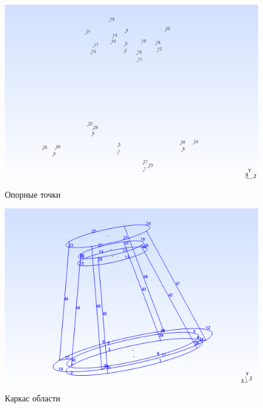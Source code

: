 \documentclass[a4paper, 14pt]{extreport}
\begin{document}
\begin{figure}[H]
	\center
	\includegraphics[scale=0.4]{pictures/main_points.png}
	\caption{Опорные точки}
	\label{fig: main_points}
\end{figure}

\begin{figure}[H]
	\center
	\includegraphics[scale=0.35]{pictures/skeleton.png}
	\caption{Каркас области}
	\label{fig: skeleton}
\end{figure}
\end{document}

